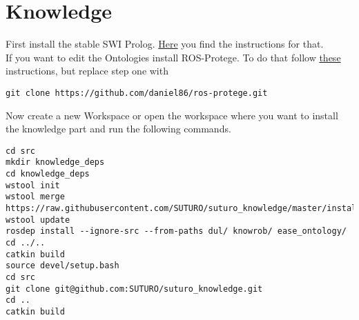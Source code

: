 \documentclass[main.tex]{subfiles}
\begin{document}
\section{Knowledge}
First install the stable SWI Prolog. \href{https://www.swi-prolog.org/build/PPA.html}{Here} you find the instructions for that.\\
If you want to edit the Ontologies install ROS-Protege. To do that follow \href{https://github.com/protegeproject/protege/wiki/Building-from-Source}{these} instructions, but replace step one with
\begin{lstlisting}
git clone https://github.com/daniel86/ros-protege.git \end{lstlisting}

Now create a new Workspace or open the workspace where you want to install the knowledge part and run the following commands.
\begin{lstlisting}
cd src
mkdir knowledge_deps
cd knowledge_deps
wstool init
wstool merge https://raw.githubusercontent.com/SUTURO/suturo_knowledge/master/install.rosinstall
wstool update
rosdep install --ignore-src --from-paths dul/ knowrob/ ease_ontology/
cd ../..
catkin build
source devel/setup.bash
cd src
git clone git@github.com:SUTURO/suturo_knowledge.git
cd ..
catkin build  \end{lstlisting}
\end{document}
